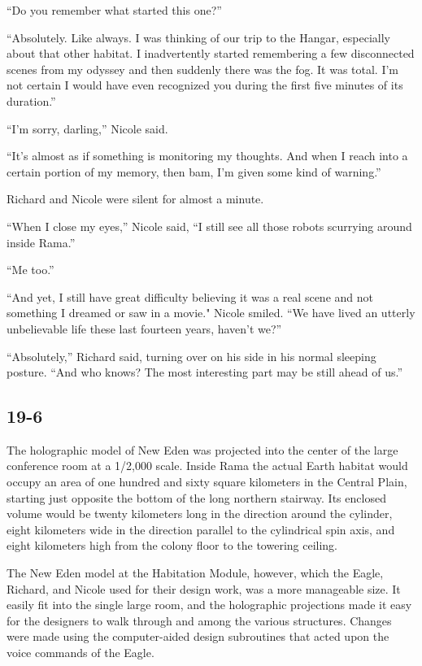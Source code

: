 \documentclass[]{article}
\begin{document}
{“Do you remember what started this one?”

“Absolutely.  Like always.  I was thinking of our trip to the Hangar, especially about that other habitat.  I inadvertently started remembering a few disconnected scenes from my odyssey and then suddenly there was the fog.  It was total.  I’m not certain I would have even recognized you during the first five minutes of its duration.”

“I’m sorry, darling,” Nicole said.

“It’s almost as if something is monitoring my thoughts.  And when I reach into a certain portion of my memory, then bam, I’m given some kind of warning.”

Richard and Nicole were silent for almost a minute.

“When I close my eyes,” Nicole said, “I still see all those robots scurrying around inside Rama.”

“Me too.”

“And yet, I still have great difficulty believing it was a real scene and not something I dreamed or saw in a movie."  Nicole smiled.  “We have lived an utterly unbelievable life these last fourteen years, haven’t we?”

“Absolutely,” Richard said, turning over on his side in his normal sleeping posture.  “And who knows? The most interesting part may be still ahead of us.”

\subsection*{19-6}

The holographic model of New Eden was projected into the center of the large conference room at a 1/2,000 scale.  Inside Rama the actual Earth habitat would occupy an area of one hundred and sixty square kilometers in the Central Plain, starting just opposite the bottom of the long northern stairway.  Its enclosed volume would be twenty kilometers long in the direction around the cylinder, eight kilometers wide in the direction parallel to the cylindrical spin axis, and eight kilometers high from the colony floor to the towering ceiling.

The New Eden model at the Habitation Module, however, which the Eagle, Richard, and Nicole used for their design work, was a more manageable size.  It easily fit into the single large room, and the holographic projections made it easy for the designers to walk through and among the various structures.  Changes were made using the computer-aided design subroutines that acted upon the voice commands of the Eagle.

}
\end{document}
